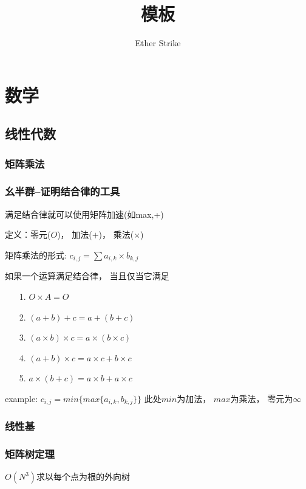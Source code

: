 \documentclass[UTF8]{article}
\title{模板}
\author{Ether Strike}
\newcommand{\cppcode}[1]{
    
}
\begin{document}
\maketitle

\tableofcontents

\newpage

\section{数学}
\subsection{线性代数}

\subsubsection{矩阵乘法}
\cppcode{matrix.cpp}

\subsubsection{幺半群--证明结合律的工具}
	满足结合律就可以使用矩阵加速(如{max,+})

	定义：零元($O$)， 加法($+$)， 乘法($\times$)

	矩阵乘法的形式: $c_{i,j} = \sum a_{i,k}\times b_{k,j}$

	如果一个运算满足结合律， 当且仅当它满足
	
	\begin{enumerate}
		\item[1.]$O\times A = O$
		\item[2.]$(a+b)+c = a+(b+c)$
		\item[3.]$(a\times b)\times c = a\times(b\times c)$
		\item[4.]$(a+b)\times c = a\times c + b\times c$
		\item[5.]$a\times(b+c) = a\times b + a\times c$
	\end{enumerate}

	example: $c_{i,j} = min\{ max\{a_{i,k}, b_{k,j}\}\}$
	此处$min$为加法， $max$为乘法， 零元为$\infty$
	
\subsubsection{线性基}
\cppcode{Linear.cpp}

\subsubsection{矩阵树定理}
$O(N^3)$求以每个点为根的外向树
\cppcode{MatrixTree2.cpp}
\end{document}
